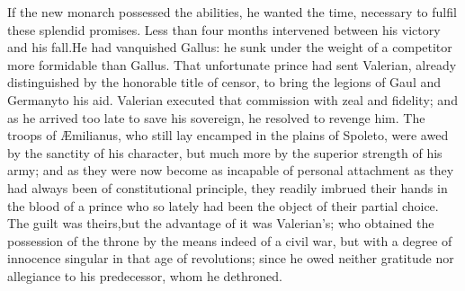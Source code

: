 



If the new monarch possessed the abilities, he wanted the time,
necessary to fulfil these splendid promises. Less than four
months intervened between his victory and his fall.\footnotemark[61] He had
vanquished Gallus: he sunk under the weight of a competitor more
formidable than Gallus. That unfortunate prince had sent
Valerian, already distinguished by the honorable title of censor,
to bring the legions of Gaul and Germany\footnotemark[62] to his aid. Valerian
executed that commission with zeal and fidelity; and as he
arrived too late to save his sovereign, he resolved to revenge
him. The troops of Æmilianus, who still lay encamped in the
plains of Spoleto, were awed by the sanctity of his character,
but much more by the superior strength of his army; and as they
were now become as incapable of personal attachment as they had
always been of constitutional principle, they readily imbrued
their hands in the blood of a prince who so lately had been the
object of their partial choice. The guilt was theirs,\footnotemark[621] but the
advantage of it was Valerian’s; who obtained the possession of
the throne by the means indeed of a civil war, but with a degree
of innocence singular in that age of revolutions; since he owed
neither gratitude nor allegiance to his predecessor, whom he
dethroned.




